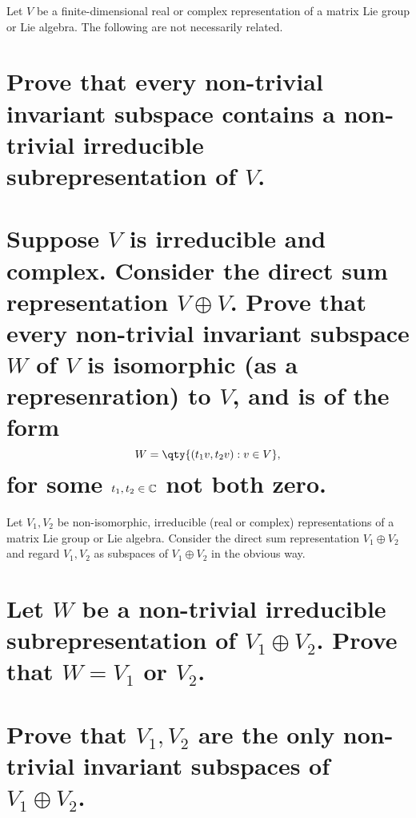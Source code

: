 \documentclass[
	pages,
	boxes,
	color=WildStrawberry
]{homework}
\begin{document}
\begin{problem}
Let $V$ be a finite-dimensional real or complex representation of a matrix Lie group or Lie algebra. The following are not necessarily related.
\begin{parts}
	\part{Prove that every non-trivial invariant subspace contains a non-trivial irreducible subrepresentation of $V$.}\label{part:5a}
	\part{Suppose $V$ is irreducible and complex. Consider the direct sum representation $V \oplus V$. Prove that every non-trivial invariant subspace $W$ of $V$ is isomorphic (as a represenration) to $V$, and is of the form
		\[
			W = \qty{(t_1v, t_2v) : v \in V},
		\]
		for some $t_1, t_2 \in \mathbb{C}$ not both zero.}\label{part:5b}
\end{parts}
\end{problem}

\begin{solution}
	\ref{part:5a}
	\ref{part:5b}
\end{solution}

\begin{problem}
Let $V_1, V_2$ be non-isomorphic, irreducible (real or complex) representations of a matrix Lie group or Lie algebra. Consider the direct sum representation $V_1 \oplus V_2$ and regard $V_1, V_2$ as subspaces of $V_1 \oplus V_2$ in the obvious way.
\begin{parts}
	\part{Let $W$ be a non-trivial irreducible subrepresentation of $V_1 \oplus V_2$. Prove that $W = V_1$ or $V_2$.}
	\part{Prove that $V_1, V_2$ are the only non-trivial invariant subspaces of $V_1 \oplus V_2$.}
\end{parts}
\end{problem}
\end{document}
